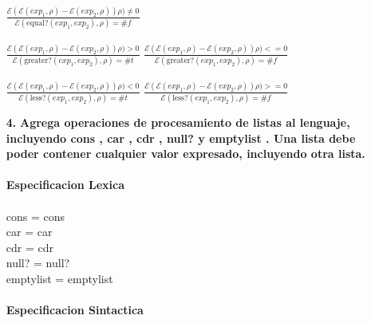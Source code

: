 \documentclass{article}
\begin{document}
\begin{itemize}
    \hspace*{10mm}
        $\frac
        {\mathcal{E}(\mathcal{E}(exp_1,\rho)-\mathcal{E}(exp_2,\rho))\rho)\neq0}
        {\mathcal{E}(\text{equal?}(exp_1, exp_2),\rho)=\#f}$\\
    \\
    \hspace*{10mm}
        $\frac
        {\mathcal{E}(\mathcal{E}(exp_1,\rho)-\mathcal{E}(exp_2,\rho))\rho)>0}
        {\mathcal{E}(\text{greater?}(exp_1, exp_2),\rho)=\#t}$
    \hspace*{10mm}
        $\frac
        {\mathcal{E}(\mathcal{E}(exp_1,\rho)-\mathcal{E}(exp_2,\rho))\rho)<=0}
        {\mathcal{E}(\text{greater?}(exp_1, exp_2),\rho)=\#f}$\\
    \\
    \hspace*{10mm}
        $\frac
        {\mathcal{E}(\mathcal{E}(exp_1,\rho)-\mathcal{E}(exp_2,\rho))\rho)<0}
        {\mathcal{E}(\text{less?}(exp_1, exp_2),\rho)=\#t}$
    \hspace*{10mm}
        $\frac
        {\mathcal{E}(\mathcal{E}(exp_1,\rho)-\mathcal{E}(exp_2,\rho))\rho)>=0}
        {\mathcal{E}(\text{less?}(exp_1, exp_2),\rho)=\#f}$
    \\
    \newpage
    \item[\textbf{4.}] \textbf{{\Large Agrega operaciones de procesamiento de listas al lenguaje, incluyendo cons , car , cdr , null? y emptylist . Una lista debe poder contener cualquier valor expresado, incluyendo otra lista.}}\\
    \\
    \textbf{Especificacion Lexica}\\
    \\
    \hspace*{10mm}cons = cons\\
    \hspace*{10mm}car = car\\
    \hspace*{10mm}cdr = cdr\\
    \hspace*{10mm}null? = null?\\
    \hspace*{10mm}emptylist = emptylist\\
    \\
    \textbf{Especificacion Sintactica}\\
    \\

\end{itemize}
\end{document}
